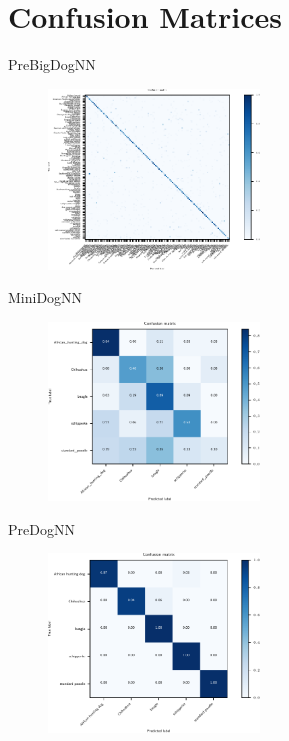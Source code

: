   \section{Confusion Matrices}

  \begin{frame}[noframenumbering]
    \tableofcontents[currentsection]
  \end{frame}

  \begin{frame}{PreBigDogNN}
    \begin{figure}
      \centering
      \includegraphics[width=0.5\textwidth]{logos/confusion_matrix_bigpretrained.pdf}
      \label{fig:cm_prebig}
    \end{figure}
  \end{frame}

  \begin{frame}{MiniDogNN}
    \begin{figure}
      \centering
      \includegraphics[width=0.5\textwidth]{logos/confusion_matrix_mini.pdf}
      \label{fig:cm_mini}
    \end{figure}
  \end{frame}

  \begin{frame}{PreDogNN}
    \begin{figure}
      \centering
      \includegraphics[width=0.5\textwidth]{logos/confusion_matrix_PreDogNN.pdf}
      \label{fig:cm_pre}
    \end{figure}
  \end{frame}


